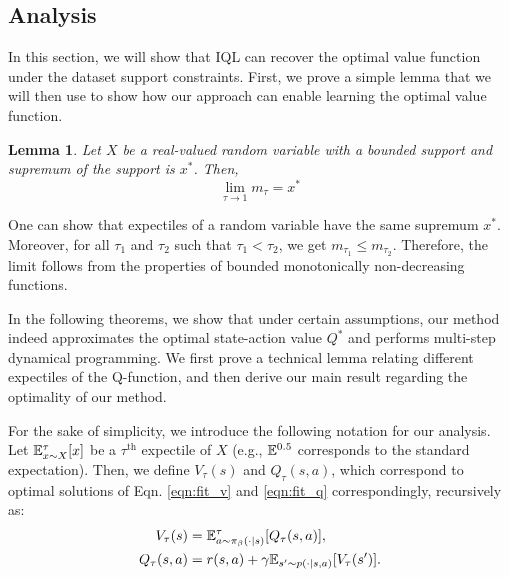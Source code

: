 \documentclass{article} %
\newtheorem{lemma}[theorem]{Lemma}
\newenvironment{sproof}{%
  \renewcommand{\proofname}{ Proof Sketch}\proof}{\endproof}
\def\ourname{IQL\xspace}
\begin{document}
\subsection{Analysis}

\label{sec:analysis}


In this section, we will show that \ourname can recover the optimal value function under the dataset support constraints.
First, we prove a simple lemma that we will then use to show how our approach can enable learning the optimal value function.
\begin{lemma}
\label{lem:1}
Let $X$ be a real-valued random variable with a bounded support
and supremum of the support is $x^*$. Then,
\vspace{-0.2cm}
$$
\lim_{\tau\rightarrow1} m_\tau = x^*
$$
\end{lemma}
\begin{sproof}
\vspace{-0.2cm}
One can show that expectiles of a random variable have the same supremum $x^*$. Moreover, for all $\tau_1$ and $\tau_2$ such that $\tau_1 < \tau_2$, we get $m_{\tau_1} \le m_{\tau_2}$. Therefore, the limit follows from the properties of bounded monotonically non-decreasing functions.
\end{sproof}

In the following theorems, we show that under certain assumptions, our method indeed approximates the optimal state-action value $Q^*$ and performs multi-step dynamical programming.
We first prove a technical lemma relating different expectiles of the Q-function, and then derive our main result regarding the optimality of our method.

For the sake of simplicity, we introduce the following notation for our analysis. Let $\mathbb{E}^\tau_{x\sim X}[x]$ be a $\tau^\text{th}$ expectile of $X$ (e.g., $\mathbb{E}^{0.5}$ corresponds to the standard expectation). Then, we define $V_{\tau}(s)$ and $Q_\tau(s, a)$, which correspond to optimal solutions of Eqn. \ref{eqn:fit_v} and \ref{eqn:fit_q} correspondingly, recursively as:
\begin{align*}
    V_\tau(s) &= \mathbb{E}^\tau_{a\sim \pi_\beta(\cdot|s)} [Q_\tau(s, a)], \\
    Q_\tau(s,a)&=r(s,a)+\gamma\mathbb{E}_{s'\sim p(\cdot|s,a)}[V_\tau(s')].
\end{align*}
\end{document}
